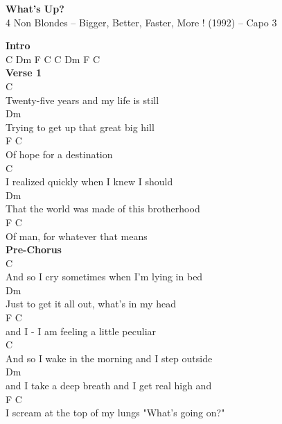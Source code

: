 \documentclass[a4paper]{article}
\begin{document}
    \begin{center}
        \textbf{What's Up?}
        ~\\
        4 Non Blondes -- Bigger, Better, Faster, More ! (1992)
         -- Capo 3
    \end{center}
    {
        \scriptsize
        \textbf{Intro}
        ~\\
        {
            \cutive
            \obeyspaces
C  Dm  F   C     C  Dm  F   C
\\

        }
        \textbf{Verse 1}
        ~\\
        {
            \cutive
            \obeyspaces
C
\\
Twenty-five years and my life is still
\\
Dm
\\
Trying to get up that great big hill
\\
   F               C
\\
Of hope for a destination
\\
C
\\
I realized quickly when I knew I should
\\
         Dm
\\
That the world was made of this brotherhood
\\
   F                      C
\\
Of man, for whatever that means
\\

        }
        \textbf{Pre-Chorus}
        ~\\
        {
            \cutive
            \obeyspaces
         C                                    
\\
And so I cry sometimes when I'm lying in bed
\\
        Dm           
\\
Just to get it all out, what's in my head  
\\
      F                         C
\\
and I - I am feeling a little peculiar
\\
         C 
\\
And so I wake in the morning and I step outside
\\
      Dm
\\
and I take a deep breath and I get real high and
\\
  F                                           C
\\
I scream at the top of my lungs "What's going on?"
\\

}}
\end{document}
